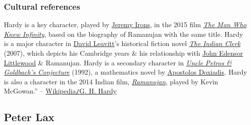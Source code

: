 \documentclass{article}
\begin{document}
\subsubsection{Cultural references}
{\sc Hardy} is a key character, played by \href{https://en.wikipedia.org/wiki/Jeremy_Irons}{Jeremy Irons}, in the 2015 film \href{https://en.wikipedia.org/wiki/The_Man_Who_Knew_Infinity_(film)}{\it The Man Who Knew Infinity}, based on the biography of {\sc Ramanujan} with the same title. {\sc Hardy} is a major character in \href{https://en.wikipedia.org/wiki/David_Leavitt}{\sc David Leavitt}'s historical fiction novel \href{https://en.wikipedia.org/wiki/The_Indian_Clerk}{\it The Indian Clerk} (2007), which depicts his Cambridge years \& his relationship with \href{https://en.wikipedia.org/wiki/John_Edensor_Littlewood}{John Edensor Littlewood} \& {\sc Ramanujan}. {\sc Hardy} is a secondary character in \href{https://en.wikipedia.org/wiki/Uncle_Petros_and_Goldbach%27s_Conjecture}{\it Uncle Petros \& Goldbach's Conjecture} (1992), a mathematics novel by \href{https://en.wikipedia.org/wiki/Apostolos_Doxiadis}{\sc Apostolos Doxiadis}. {\sc Hardy} is also a character in the 2014 Indian film, \href{https://en.wikipedia.org/wiki/Ramanujan_(film)}{\it Ramanujan}, played by {\sc Kevin McGowan}.'' -- \href{https://en.wikipedia.org/wiki/G._H._Hardy}{Wikipedia{\tt/}G. H. Hardy}


\subsection{Peter Lax}

\end{document}
